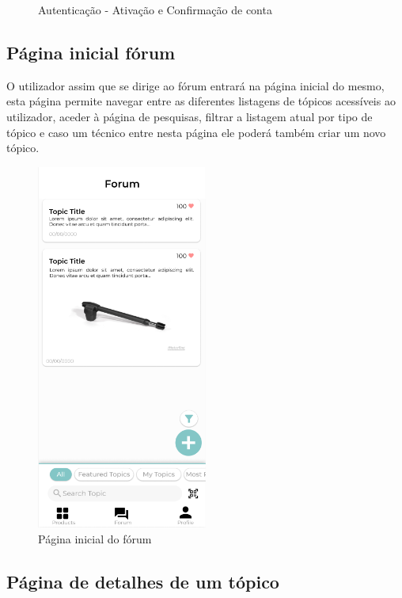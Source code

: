 \begin{figure}[htb]
    \caption{Autenticação - Ativação e Confirmação de conta}%
    \label{fig:25}%
\end{figure}

\newpage

\subsection{Página inicial fórum}

O utilizador assim que se dirige ao fórum entrará na página inicial do mesmo, esta página permite navegar 
entre as diferentes listagens de tópicos acessíveis ao utilizador, aceder à página de pesquisas, filtrar a 
listagem atual por tipo de tópico e caso um técnico entre nesta página ele poderá também criar um novo 
tópico.

\begin{figure}[htb]
    \centering
    \includegraphics[width=0.5\textwidth]{images/mockups/forum_home.png}
    \caption{Página inicial do fórum}
    \label{fig:26}
\end{figure}

\newpage

\subsection{Página de detalhes de um tópico}


